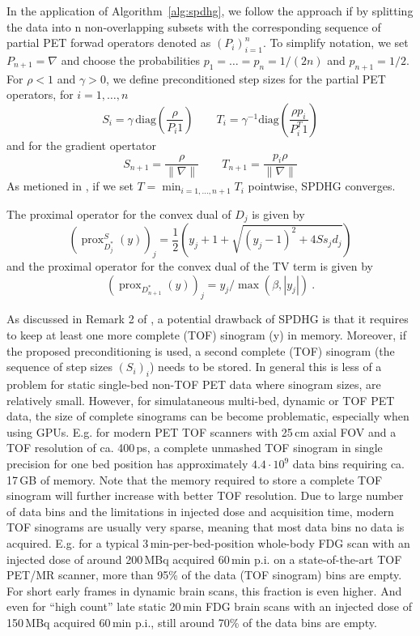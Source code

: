 \documentclass[11pt,twocolumn,twoside]{article}
\DeclareMathOperator{\prox}{prox}
\begin{document}
In the application of Algorithm~\ref{alg:spdhg}, we follow the approach if \cite{Ehrhardt2019}
by splitting the data into n non-overlapping subsets with the corresponding 
sequence of partial PET forwad operators denoted as $(P_i)_{i=1}^n$.
To simplify notation, we set $P_{n+1} = \nabla$ and choose the probabilities $p_1=\ldots=p_n = 1/(2n)$
and $p_{n+1} = 1/2$.
For $\rho<1$ and $\gamma>0$, we define preconditioned step sizes for the partial PET operators, 
for $i=1,\ldots,n$
\[ S_i = \gamma \, \text{diag}(\frac{\rho}{P_i 1} )\qquad  T_i = \gamma^{-1} \text{diag}(\frac{\rho p_i}{P^T_i 1}) \]
and for the gradient opertator
\[ S_{n+1} = \frac{\rho}{\|\nabla\|} \qquad T_{n+1} = \frac{p_i\rho}{\|\nabla\|} \]  
As metioned in \cite{Ehrhardt2019}, if we set $T = \min_{i=1,\ldots,n+1} T_i$ pointwise,
SPDHG converges.

The proximal operator for the convex dual of $D_j$ is given by
\begin{equation}
(\prox_{D_j^*}^{S}(y))_j = \frac{1}{2} \left(y_j + 1 + \sqrt{ (y_j-1)^2 + 4 S s_j d_j} \right)
\label{eq:proxD}
\end{equation} 
and the proximal operator for the convex dual of the TV term is given by
\begin{equation}
(\prox_{D_{n+1}^*}(y) )_j = y_j /\max(\beta,|y_j|) \ .
\end{equation}

As discussed in Remark 2 of \cite{Ehrhardt2019}, a potential drawback of SPDHG is that it requires
to keep at least one more complete (TOF) sinogram (y) in memory. 
Moreover, if the proposed preconditioning is used, a second complete (TOF) sinogram
(the sequence of step sizes $(S_i)_i$) needs to be stored.
In general this is less of a problem for static single-bed non-TOF PET data where sinogram sizes, 
are relatively small.
However, for simulataneous multi-bed, dynamic or TOF PET data, the size of complete sinograms
can be become problematic, especially when using GPUs.
E.g. for modern PET TOF scanners with 25\,cm axial FOV and a TOF resolution of ca. 400\,ps, 
a complete unmashed TOF sinogram in single precision for one bed position 
has approximately $4.4\cdot10^9$ data bins requiring ca. 17\,GB of memory.
Note that the memory required to store a complete TOF sinogram will further 
increase with better TOF resolution.
Due to large number of data bins and the limitations in injected dose and acquisition time,
modern TOF sinograms are usually very sparse, meaning that most data bins no data is
acquired.
E.g. for a typical 3\,min-per-bed-position whole-body FDG scan with an injected dose 
of around 200\,MBq acquired 60\,min p.i. on a state-of-the-art TOF PET/MR scanner, 
more than 95\% of the data (TOF sinogram) bins are empty.
For short early frames in dynamic brain scans, this fraction is even higher.
And even for ``high count'' late static 20\,min FDG brain scans with an injected dose of 150\,MBq
acquired 60\,min p.i., still around 70\% of the data bins are empty.
\end{document}
